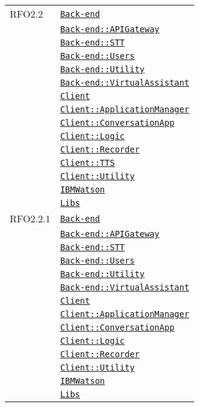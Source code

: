 \begin{longtable}{|>{\centering}m{3cm}|m{10cm}<{\centering}|}
RFO2.2 & \hyperref[Back-end]{\texttt{Back-end}}\\
& \hyperref[Back-end::APIGateway]{\texttt{Back-end::APIGateway}}\\
& \hyperref[Back-end::STT]{\texttt{Back-end::STT}}\\
& \hyperref[Back-end::Users]{\texttt{Back-end::Users}}\\
& \hyperref[Back-end::Utility]{\texttt{Back-end::Utility}}\\
& \hyperref[Back-end::VirtualAssistant]{\texttt{Back-end::VirtualAssistant}}\\
& \hyperref[Client]{\texttt{Client}}\\
& \hyperref[Client::ApplicationManager]{\texttt{Client::ApplicationManager}}\\
& \hyperref[Client::ConversationApp]{\texttt{Client::ConversationApp}}\\
& \hyperref[Client::Logic]{\texttt{Client::Logic}}\\
& \hyperref[Client::Recorder]{\texttt{Client::Recorder}}\\
& \hyperref[Client::TTS]{\texttt{Client::TTS}}\\
& \hyperref[Client::Utility]{\texttt{Client::Utility}}\\
& \hyperref[IBMWatson]{\texttt{IBMWatson}}\\
& \hyperref[Libs]{\texttt{Libs}}\\ \hline

RFO2.2.1 & \hyperref[Back-end]{\texttt{Back-end}}\\
& \hyperref[Back-end::APIGateway]{\texttt{Back-end::APIGateway}}\\
& \hyperref[Back-end::STT]{\texttt{Back-end::STT}}\\
& \hyperref[Back-end::Users]{\texttt{Back-end::Users}}\\
& \hyperref[Back-end::Utility]{\texttt{Back-end::Utility}}\\
& \hyperref[Back-end::VirtualAssistant]{\texttt{Back-end::VirtualAssistant}}\\
& \hyperref[Client]{\texttt{Client}}\\
& \hyperref[Client::ApplicationManager]{\texttt{Client::ApplicationManager}}\\
& \hyperref[Client::ConversationApp]{\texttt{Client::ConversationApp}}\\
& \hyperref[Client::Logic]{\texttt{Client::Logic}}\\
& \hyperref[Client::Recorder]{\texttt{Client::Recorder}}\\
& \hyperref[Client::Utility]{\texttt{Client::Utility}}\\
& \hyperref[IBMWatson]{\texttt{IBMWatson}}\\
& \hyperref[Libs]{\texttt{Libs}}\\ \hline


\end{longtable}
